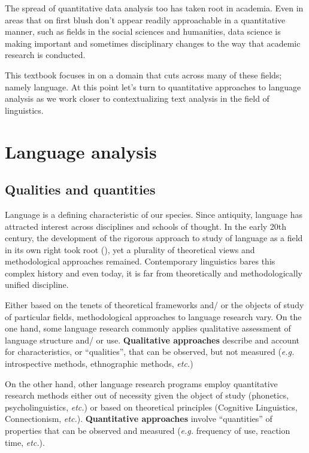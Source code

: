\documentclass[
  letterpaper,
]{latex/krantz}
\theoremstyle{definition}
\theoremstyle{remark}
\begin{document}
The spread of quantitative data analysis too has taken root in academia.
Even in areas that on first blush don't appear readily approachable in a
quantitative manner, such as fields in the social sciences and
humanities, data science is making important and sometimes disciplinary
changes to the way that academic research is conducted.

This textbook focuses in on a domain that cuts across many of these
fields; namely language. At this point let's turn to quantitative
approaches to language analysis as we work closer to contextualizing
text analysis in the field of linguistics.

\section{Language analysis}\label{language-analysis}

\subsection{Qualities and quantities}\label{qualities-and-quantities}

Language is a defining characteristic of our species. Since antiquity,
language has attracted interest across disciplines and schools of
thought. In the early 20th century, the development of the rigorous
approach to study of language as a field in its own right took root
(), yet a plurality of
theoretical views and methodological approaches remained. Contemporary
linguistics bares this complex history and even today, it is far from
theoretically and methodologically unified discipline.

Either based on the tenets of theoretical frameworks and/ or the objects
of study of particular fields, methodological approaches to language
research vary. On the one hand, some language research commonly applies
qualitative assessment of language structure and/ or use.
\textbf{Qualitative approaches} describe and account for
characteristics, or ``qualities'', that can be observed, but not
measured (\emph{e.g.} introspective methods, ethnographic methods,
\emph{etc.})

On the other hand, other language research programs employ quantitative
research methods either out of necessity given the object of study
(phonetics, psycholinguistics, \emph{etc.}) or based on theoretical
principles (Cognitive Linguistics, Connectionism, \emph{etc.}).
\textbf{Quantitative approaches} involve ``quantities'' of properties
that can be observed and measured (\emph{e.g.} frequency of use,
reaction time, \emph{etc.}).
\end{document}
